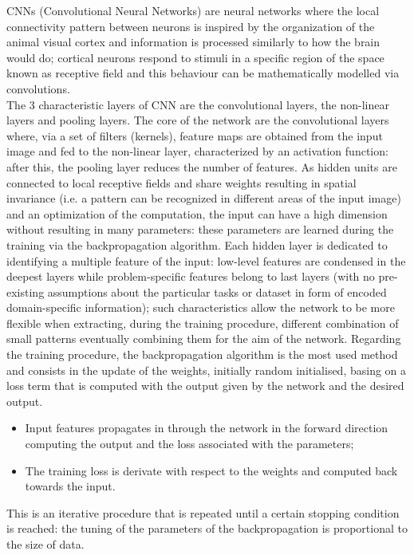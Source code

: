 \documentclass[12pt]{article}
\begin{document}
CNNs (Convolutional Neural Networks) are neural networks where the local connectivity pattern between neurons is inspired by the organization of the animal visual cortex and information is processed similarly to how the brain would do; cortical neurons respond to stimuli in a specific region of the space known as receptive field and this behaviour can be mathematically modelled via convolutions.\\ The 3 characteristic layers of CNN are the convolutional layers, the non-linear layers and pooling layers. The core of the network are the convolutional layers where, via a set of filters (kernels), feature maps are obtained from the input image and fed to the non-linear layer, characterized by an activation function: after this, the pooling layer reduces the number of features. As hidden units are connected to local receptive fields and share weights resulting in spatial invariance (i.e. a pattern can be recognized in different areas of the input image) and an optimization of the computation, the input can have a high dimension without resulting in many parameters: these parameters are learned during the training via the backpropagation algorithm. Each hidden layer is dedicated to identifying a multiple feature of the input: low-level features are condensed in the deepest layers while problem-specific features belong to last layers (with no pre-existing assumptions about the particular tasks or dataset in form of encoded domain-specific information); such characteristics allow the network to be more flexible when extracting, during the training procedure, different combination of small patterns eventually combining them for the aim of the network. Regarding the training procedure, the backpropagation algorithm is the most used method and consists in the update of the weights, initially random initialised, basing on a loss term that is computed with the output given by the network and the desired output.\\
\begin{itemize}
	\item Input features propagates in through the network in the forward direction computing the output and the loss associated with the parameters;
	\item The training loss is derivate with respect to the weights and computed back towards the input.
\end{itemize}
This is an iterative procedure that is repeated until a certain stopping condition is reached: the tuning of the parameters of the backpropagation is proportional to the size of data. 
\end{document}
